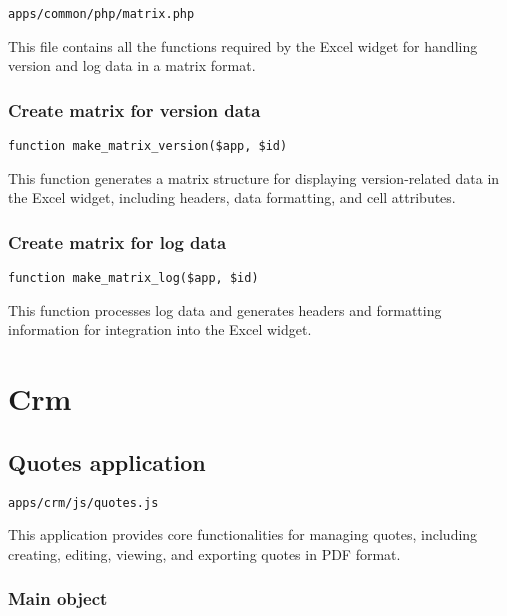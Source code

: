 \documentclass[a4paper]{article}
\begin{document}
\begin{lstlisting}
apps/common/php/matrix.php
\end{lstlisting}

This file contains all the functions required by the Excel widget for handling
version and log data in a matrix format.

\hypertarget{toc35}{}
\subsubsection{Create matrix for version data}

\begin{lstlisting}
function make_matrix_version($app, $id)
\end{lstlisting}

This function generates a matrix structure for displaying version-related data
in the Excel widget, including headers, data formatting, and cell attributes.

\hypertarget{toc36}{}
\subsubsection{Create matrix for log data}

\begin{lstlisting}
function make_matrix_log($app, $id)
\end{lstlisting}

This function processes log data and generates headers and formatting information
for integration into the Excel widget.


\hypertarget{toc37}{}
\section{Crm}

\hypertarget{toc38}{}
\subsection{Quotes application}

\begin{lstlisting}
apps/crm/js/quotes.js
\end{lstlisting}

This application provides core functionalities for managing quotes, including creating,
editing, viewing, and exporting quotes in PDF format.

\hypertarget{toc39}{}
\subsubsection{Main object}
\end{document}

